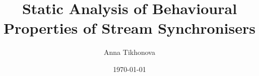 \documentclass{report}
\begin{document}
\author{Anna Tikhonova}
\title{Static Analysis of Behavioural Properties of Stream Synchronisers}
\date{\today}
\maketitle
\tableofcontents












\begin{appendices}

\end{appendices}
\end{document}
